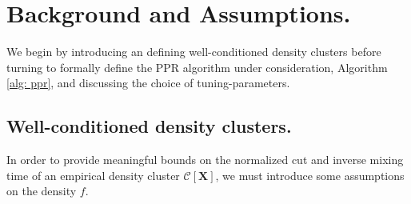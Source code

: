 \documentclass{article}
\newcommand{\1}{\mathbf{1}}
\newcommand{\Xbf}{\mathbf{X}}
\newcommand{\Cset}{\mathcal{C}}
\theoremstyle{aldenthm}
\theoremstyle{remark}
\begin{document}
\section{Background and Assumptions.}
\label{sec: background}

We begin by introducing an defining well-conditioned density clusters before turning to formally define the PPR algorithm under consideration, Algorithm \ref{alg: ppr}, and discussing the choice of tuning-parameters.

\subsection{Well-conditioned density clusters.}

In order to provide meaningful bounds on the normalized cut and inverse mixing time of an empirical density cluster $\Cset[\Xbf]$, we must introduce some assumptions on the density $f$. 
\end{document}
